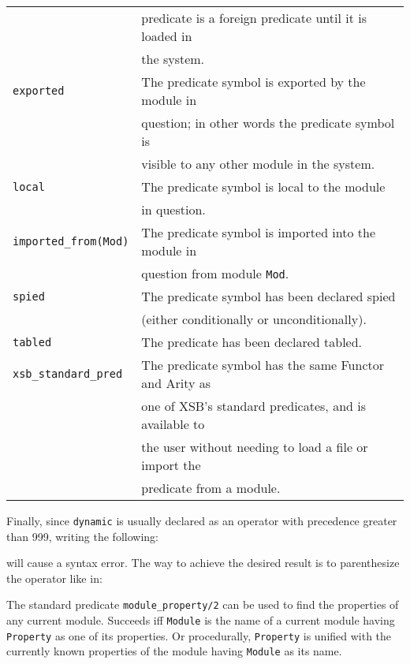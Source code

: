 \begin{description}
\begin{center}
\begin{tabular}{||l|l||}
	&	predicate is a foreign predicate until it is loaded in	 \\
	&	the system.\\ \hline
	\hline
	{\tt exported}	&
		The predicate symbol is exported by the module in \\ 
	&	question; in other words the predicate symbol is \\
	&	visible to any other module in the system. \\ \hline
	{\tt local}	& 
		The predicate symbol is local to the module \\
	&	in question. \\ \hline
	{\tt imported\_from(Mod)}	& 
		The predicate symbol is imported into the module in \\
	&	question from module {\tt Mod}. \\ \hline
	\hline
	{\tt spied}		&
		The predicate symbol has been declared spied \\
	&	(either conditionally or unconditionally). \\ \hline
	\hline
	{\tt tabled}	& 
		The predicate has been declared tabled. \\ \hline
	\hline
	{\tt xsb\_standard\_pred}	& 
		The predicate symbol has the same Functor and Arity as  \\
	&	one of XSB's standard predicates, and is available to \\
	&	the user without needing to load a file or import the \\
	&	predicate from a module. \\ \hline
    \end{tabular}
    \end{center}

    Finally, since {\tt dynamic} is usually declared as an operator with 
    precedence greater than 999, writing the following:


    will cause a syntax error. The way to achieve the desired result is to
    parenthesize the operator like in:



    The standard predicate {\tt module\_property/2} can be used to find the
    properties of any current module.
    Succeeds iff {\tt Module} is the name of a current module having 
    {\tt Property} as one of its properties. Or procedurally, {\tt Property}
    is unified with the currently known properties of the module having 
    {\tt Module} as its name.


\end{description}
